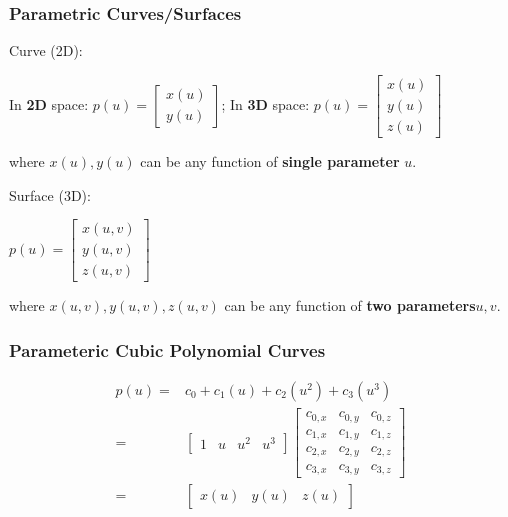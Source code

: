 \documentclass{beamer}
\begin{document}
\begin{frame}
    \frametitle{Parametric Curves/Surfaces}

    \begin{tcolorbox}
        Curve (2D):
        \begin{center}
            In \textbf{2D} space: $p(u) = \left[\begin{matrix} x(u) \\ y(u) \end{matrix}\right]$; \hspace{0.3em}
            In \textbf{3D} space: $p(u) = \left[\begin{matrix} x(u) \\ y(u) \\ z(u) \end{matrix}\right]$\\
        \end{center}
        where $x(u), y(u)$ can be any function of \textbf{single parameter} $u$.
    \end{tcolorbox}

    \vspace{0.5em}

    \begin{tcolorbox}
        Surface (3D):
        \begin{center}
            $p(u) = \left[\begin{matrix} x(u,v) \\ y(u,v) \\ z(u,v) \end{matrix}\right]$\\
        \end{center}
        where $x(u,v), y(u,v), z(u,v)$ can be any function of \textbf{two parameters}$ u, v$.
    \end{tcolorbox}
\end{frame}

\begin{frame}
    \frametitle{Parameteric Cubic Polynomial Curves}

    \begin{eqnarray*}
        p(u) =& c_0 + c_1 (u) + c_2 (u^2) + c_3 (u^3) \\
             =& 
            \begin{bmatrix}
                1 & u & u^2 & u^3
            \end{bmatrix}
            \begin{bmatrix}
                c_{0,x} & c_{0,y} & c_{0,z} \\
                c_{1,x} & c_{1,y} & c_{1,z} \\
                c_{2,x} & c_{2,y} & c_{2,z} \\
                c_{3,x} & c_{3,y} & c_{3,z}
            \end{bmatrix}\\
            =& 
            \begin{bmatrix}
                x(u) & y(u) & z(u)
            \end{bmatrix}
    \end{eqnarray*}

\end{frame}
\end{document}
